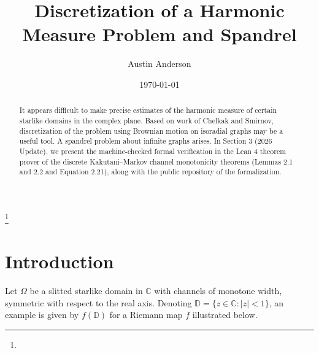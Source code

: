 \documentclass[]{amsart}
\numberwithin{equation}{section}
\newcommand{\D}{\mathbb{D}}
\newcommand{\C}{\mathbb{C}}
\begin{document}
\title[Discretization of a Harmonic Measure Problem and Spandrel]
{Discretization of a Harmonic Measure Problem and Spandrel}
\date{\today}

\author[A. Anderson]{Austin Anderson}



\thanks {}

\begin{abstract} 
It appears difficult to make precise estimates of the harmonic measure of certain starlike domains in the complex plane.  Based on work of Chelkak and Smirnov, discretization of the problem using Brownian motion on isoradial graphs may be a useful tool.  A spandrel problem about infinite graphs arises. In Section 3 (2026 Update), we present the machine-checked formal verification in the Lean 4 theorem prover of the discrete Kakutani--Markov channel monotonicity theorems (Lemmas 2.1 and 2.2 and Equation 2.21), along with the public repository of the formalization.
\end{abstract}
\maketitle

\section{Introduction}

Let $\varOmega$ be a slitted starlike domain in $\mathbb{C}$ with channels of monotone width, symmetric with respect to the real axis. Denoting $\D = \{z \in \C : |z| < 1\}$, an example is given by $f(\D)$ for a Riemann map $f$ illustrated below.
\end{document}
